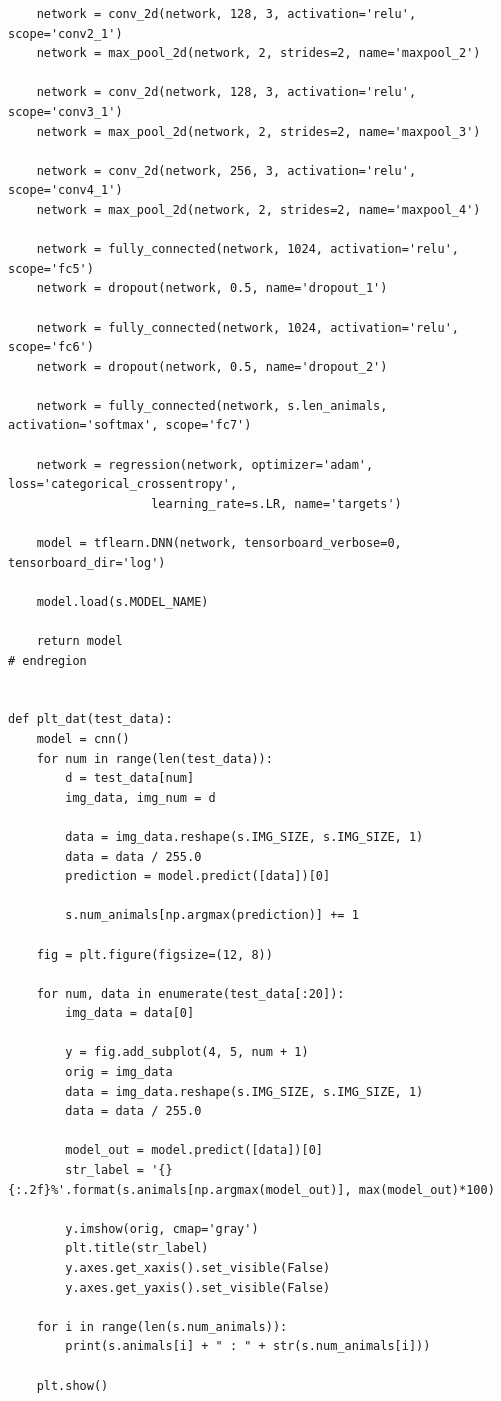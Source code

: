 \documentclass[12pt,a4paper]{article}
\begin{document}
\begin{itemize}
{\begin{verbatim}
    network = conv_2d(network, 128, 3, activation='relu', scope='conv2_1')
    network = max_pool_2d(network, 2, strides=2, name='maxpool_2')

    network = conv_2d(network, 128, 3, activation='relu', scope='conv3_1')
    network = max_pool_2d(network, 2, strides=2, name='maxpool_3')

    network = conv_2d(network, 256, 3, activation='relu', scope='conv4_1')
    network = max_pool_2d(network, 2, strides=2, name='maxpool_4')

    network = fully_connected(network, 1024, activation='relu', scope='fc5')
    network = dropout(network, 0.5, name='dropout_1')

    network = fully_connected(network, 1024, activation='relu', scope='fc6')
    network = dropout(network, 0.5, name='dropout_2')

    network = fully_connected(network, s.len_animals, activation='softmax', scope='fc7')

    network = regression(network, optimizer='adam', loss='categorical_crossentropy', 
                    learning_rate=s.LR, name='targets')

    model = tflearn.DNN(network, tensorboard_verbose=0, tensorboard_dir='log')

    model.load(s.MODEL_NAME)

    return model
# endregion


def plt_dat(test_data):
    model = cnn()
    for num in range(len(test_data)):
        d = test_data[num]
        img_data, img_num = d

        data = img_data.reshape(s.IMG_SIZE, s.IMG_SIZE, 1)
        data = data / 255.0
        prediction = model.predict([data])[0]

        s.num_animals[np.argmax(prediction)] += 1

    fig = plt.figure(figsize=(12, 8))

    for num, data in enumerate(test_data[:20]):
        img_data = data[0]

        y = fig.add_subplot(4, 5, num + 1)
        orig = img_data
        data = img_data.reshape(s.IMG_SIZE, s.IMG_SIZE, 1)
        data = data / 255.0

        model_out = model.predict([data])[0]
        str_label = '{} {:.2f}%'.format(s.animals[np.argmax(model_out)], max(model_out)*100)

        y.imshow(orig, cmap='gray')
        plt.title(str_label)
        y.axes.get_xaxis().set_visible(False)
        y.axes.get_yaxis().set_visible(False)

    for i in range(len(s.num_animals)):
        print(s.animals[i] + " : " + str(s.num_animals[i]))

    plt.show()
        \end{verbatim}
    }
    
    \end{itemize}
\end{document}
